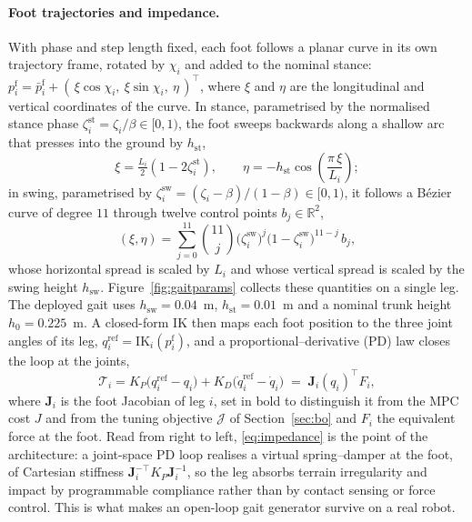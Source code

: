 \documentclass[11pt,a4paper]{article}
\newcommand{\R}{\mathbb{R}}
\newcommand{\pf}{p^{\mathrm{f}}}
\begin{document}
\paragraph{Foot trajectories and impedance.} With phase and step length fixed, each foot follows a planar
curve in its own trajectory frame, rotated by $\chi_i$ and added to the nominal stance:
$\pf_i=\bar\pf_i+(\,\xi\cos\chi_i,\ \xi\sin\chi_i,\ \eta\,)^{\!\top}$, where $\xi$ and $\eta$ are the
longitudinal and vertical coordinates of the curve. In stance, parametrised by the normalised stance phase
$\zeta_i^{\mathrm{st}}=\zeta_i/\beta\in[0,1)$, the foot sweeps backwards along a shallow arc that presses into
the ground by $h_{\mathrm{st}}$,
\begin{equation}
  \xi=\tfrac{L_i}{2}\left(1-2\zeta_i^{\mathrm{st}}\right),\qquad
  \eta=-h_{\mathrm{st}}\cos\!\left(\frac{\pi\,\xi}{L_i}\right);
  \label{eq:stance}
\end{equation}
in swing, parametrised by $\zeta_i^{\mathrm{sw}}=(\zeta_i-\beta)/(1-\beta)\in[0,1)$, it follows a Bézier curve
of degree $11$ through twelve control points $b_j\in\R^2$,
\begin{equation}
  (\xi,\eta)=\sum_{j=0}^{11}\binom{11}{j}
             \big(\zeta_i^{\mathrm{sw}}\big)^{j}\big(1-\zeta_i^{\mathrm{sw}}\big)^{11-j}\,b_j ,
  \label{eq:swing}
\end{equation}
whose horizontal spread is scaled by $L_i$ and whose vertical spread is scaled by the swing height
$h_{\mathrm{sw}}$. Figure~\ref{fig:gaitparams} collects these quantities on a single leg. The deployed gait uses $h_{\mathrm{sw}}=0.04$~m, $h_{\mathrm{st}}=0.01$~m and a nominal
trunk height $h_0=0.225$~m. A closed-form IK then maps each foot position to the three joint angles of its
leg, $q_i^{\mathrm{ref}}=\mathrm{IK}_i(\pf_i)$, and a proportional--derivative (PD) law closes the loop at the
joints,
\begin{equation}
  \mathcal{T}_i = K_P\big(q_i^{\mathrm{ref}}-q_i\big)+K_D\big(\dot q_i^{\mathrm{ref}}-\dot q_i\big)
  \;=\;\bm{J}_i(q_i)^{\!\top}F_i ,
  \label{eq:impedance}
\end{equation}
where $\bm{J}_i$ is the foot Jacobian of leg $i$, set in bold to distinguish it from the MPC cost $J$ and
from the tuning objective $\mathcal{J}$ of Section~\ref{sec:bo} and $F_i$ the equivalent force at the
foot. Read from right to left, \eqref{eq:impedance} is the point of the architecture: a joint-space PD loop
realises a virtual spring--damper at the foot, of Cartesian stiffness
$\bm{J}_i^{-\top}K_P\bm{J}_i^{-1}$, so the leg absorbs terrain irregularity and impact by
programmable compliance rather than by contact sensing or force control. This is what makes an open-loop gait
generator survive on a real robot.
\end{document}

